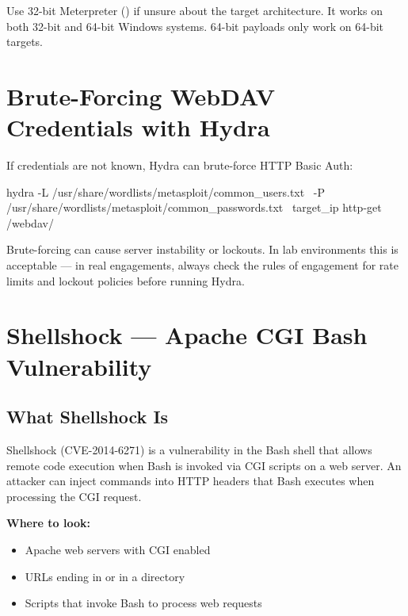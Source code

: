 \begin{notebox}
\begin{notebox}
Use 32-bit Meterpreter () if unsure about
the target architecture. It works on both 32-bit and 64-bit Windows systems.
64-bit payloads only work on 64-bit targets.
\end{notebox}

\section{Brute-Forcing WebDAV Credentials with Hydra}
\label{sec:webdav_hydra}

If credentials are not known, Hydra can brute-force HTTP Basic Auth:

\begin{termbox}
hydra -L /usr/share/wordlists/metasploit/common_users.txt \
      -P /usr/share/wordlists/metasploit/common_passwords.txt \
      target_ip http-get /webdav/
\end{termbox}

\begin{notebox}
Brute-forcing can cause server instability or lockouts. In lab environments this
is acceptable --- in real engagements, always check the rules of engagement for
rate limits and lockout policies before running Hydra.
\end{notebox}


\section{Shellshock --- Apache CGI Bash Vulnerability}
\label{sec:shellshock}

\subsection{What Shellshock Is}

Shellshock (CVE-2014-6271) is a vulnerability in the Bash shell that allows
remote code execution when Bash is invoked via CGI scripts on a web server.
An attacker can inject commands into HTTP headers that Bash executes when
processing the CGI request.

\textbf{Where to look:}
\begin{itemize}
  \item Apache web servers with CGI enabled
  \item URLs ending in  or in a  directory
  \item Scripts that invoke Bash to process web requests
\end{itemize}


\end{notebox}
